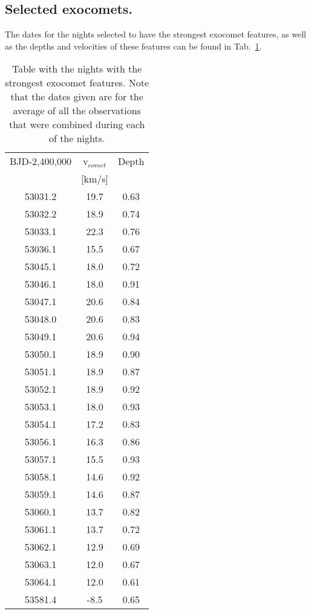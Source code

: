 \documentclass{aa}
\begin{document}



\clearpage
\FloatBarrier

\begin{appendix}
    
\section{Selected exocomets.}\label{sec:app_FEBs}
The dates for the nights selected to have the strongest exocomet features, as well as the depths and velocities of these features can be found in Tab.~\ref{tab:FEB_data}.
\begin{table}
\caption{Table with the nights with the strongest exocomet features. Note that the dates given are for the average of all the observations that were combined during each of the nights.}\label{tab:FEB_data}
\begin{tabular}{c c c}
   BJD-2,400,000  &    v$_{comet}$  &  Depth\\
 & [km/s] & \\
 \hline
\hline
53031.2 & 19.7 & 0.63\\
53032.2 & 18.9 & 0.74\\
53033.1 & 22.3 & 0.76\\
53036.1 & 15.5 & 0.67\\
53045.1 & 18.0 & 0.72\\
53046.1 & 18.0 & 0.91\\
53047.1 & 20.6 & 0.84\\
53048.0 & 20.6 & 0.83\\
53049.1 & 20.6 & 0.94\\
53050.1 & 18.9 & 0.90\\
53051.1 & 18.9 & 0.87\\
53052.1 & 18.9 & 0.92\\
53053.1 & 18.0 & 0.93\\
53054.1 & 17.2 & 0.83\\
53056.1 & 16.3 & 0.86\\
53057.1 & 15.5 & 0.93\\
53058.1 & 14.6 & 0.92\\
53059.1 & 14.6 & 0.87\\
53060.1 & 13.7 & 0.82\\
53061.1 & 13.7 & 0.72\\
53062.1 & 12.9 & 0.69\\
53063.1 & 12.0 & 0.67\\
53064.1 & 12.0 & 0.61\\
53581.4 & -8.5 & 0.65\\

\end{tabular}
\end{table}
\end{appendix}
\end{document}
